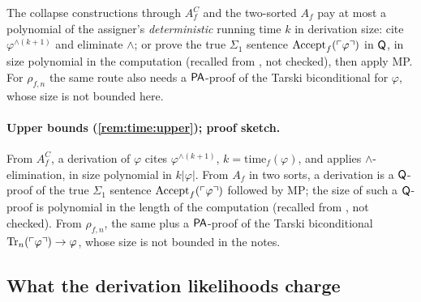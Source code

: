 \begin{remark}\label{rem:time:upper}
The collapse constructions through $A^C_f$ and the two-sorted $A_f$ pay at most a polynomial of the assigner's \emph{deterministic} running time $k$ in derivation size: cite $\varphi^{\wedge(k+1)}$ and eliminate $\wedge$; or prove the true $\Sigma_1$ sentence $\mathrm{Accept}_{f}(\ulcorner \varphi\urcorner)$ in $\mathsf{Q}$, in size polynomial in the computation (recalled from \citealp{pudlak1998lengths}, not checked), then apply MP. For $\rho_{f,n}$ the same route also needs a $\mathsf{PA}$-proof of the Tarski biconditional for $\varphi$, whose size is not bounded here.
\end{remark}

\paragraph{Upper bounds (\cref{rem:time:upper}); proof sketch.} From $A^C_f$, a derivation of $\varphi$ cites $\varphi^{\wedge(k+1)}$, $k=\mathrm{time}_f(\varphi)$, and applies $\wedge$-elimination, in size polynomial in $k|\varphi|$. From $A_f$ in two sorts, a derivation is a $\mathsf{Q}$-proof of the true $\Sigma_1$ sentence $\mathrm{Accept}_{f}(\ulcorner \varphi\urcorner)$ followed by MP; the size of such a $\mathsf{Q}$-proof is polynomial in the length of the computation (recalled from \citealp{pudlak1998lengths}, not checked). From $\rho_{f,n}$, the same plus a $\mathsf{PA}$-proof of the Tarski biconditional $\mathrm{Tr}_n(\ulcorner \varphi\urcorner)\to\varphi$, whose size is not bounded in the notes.

\subsection{What the derivation likelihoods charge}\label{app:time:lik}

